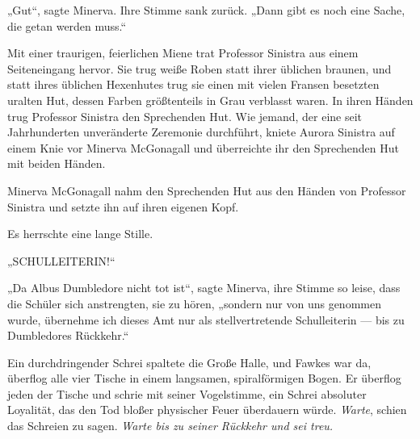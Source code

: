 „Gut“, sagte Minerva. Ihre Stimme sank zurück.
„Dann gibt es noch eine Sache, die getan werden muss.“

Mit einer traurigen, feierlichen Miene trat Professor Sinistra aus einem Seiteneingang hervor. Sie trug weiße Roben statt ihrer üblichen braunen, und statt ihres üblichen Hexenhutes trug sie einen mit vielen Fransen besetzten uralten Hut, dessen Farben größtenteils in Grau verblasst waren.
In ihren Händen trug Professor Sinistra den Sprechenden Hut.
Wie jemand, der eine seit Jahrhunderten unveränderte Zeremonie durchführt, kniete Aurora Sinistra auf einem Knie vor Minerva McGonagall und überreichte ihr den Sprechenden Hut mit beiden Händen.

Minerva McGonagall nahm den Sprechenden Hut aus den Händen von Professor Sinistra und setzte ihn auf ihren eigenen Kopf.

Es herrschte eine lange Stille.

„SCHULLEITERIN!“

„Da Albus Dumbledore nicht tot ist“, sagte Minerva, ihre Stimme so leise, dass die Schüler sich anstrengten, sie zu hören, „sondern nur von uns genommen wurde, übernehme ich dieses Amt nur als stellvertretende Schulleiterin — bis zu Dumbledores Rückkehr.“

Ein durchdringender Schrei spaltete die Große Halle, und Fawkes war da, überflog alle vier Tische in einem langsamen, spiralförmigen Bogen. Er überflog jeden der Tische und schrie mit seiner Vogelstimme, ein Schrei absoluter Loyalität, das den Tod bloßer physischer Feuer überdauern würde. \emph{Warte}, schien das Schreien zu sagen. \emph{Warte bis zu seiner Rückkehr und sei treu.}

